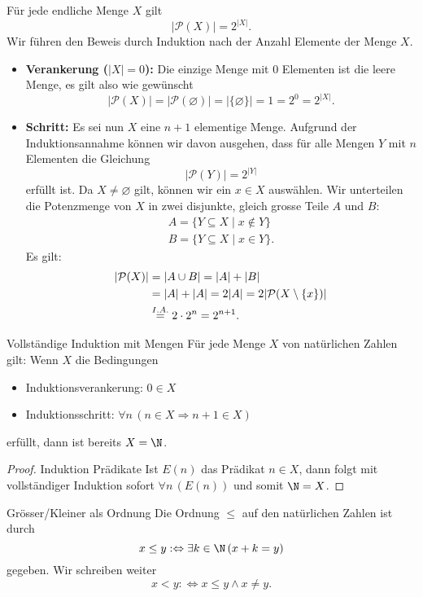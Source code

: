 \begin{example}
Für jede endliche Menge $X$ gilt
\[
|\mathcal{P}(X)|=2^{|X|}.
\]
\tcblower
Wir führen den Beweis durch Induktion nach der Anzahl Elemente der Menge $X$.
\begin{itemize}
\item \textbf{Verankerung ($|X|=0$):} Die einzige Menge mit $0$ Elementen ist die leere Menge, es gilt also wie gewünscht
\[
|\mathcal{P}(X)|=|\mathcal{P}(\varnothing)|=|\{\varnothing\}|=1=2^0=2^{|X|}.
\]
\item \textbf{Schritt:} Es sei nun $X$ eine $n+1$ elementige Menge. Aufgrund der Induktionsannahme können wir davon ausgehen, dass für alle Mengen $Y$ mit $n$ Elementen die Gleichung
\[
|\mathcal{P}(Y)|=2^{|Y|}
\]
 erfüllt ist. Da $X\neq\varnothing$ gilt, können wir ein $x\in X$ auswählen. Wir unterteilen die Potenzmenge von $X$ in zwei disjunkte, gleich grosse Teile $A$ und $B$:
 \begin{align*}
 A=\{Y\subseteq X\mid x\notin Y \}\\
 B=\{Y\subseteq X\mid x\in Y \}.
 \end{align*}
Es gilt:
\begin{align*}
|\mathcal{P}(X)|&=|A\cup B|=|A|+|B|\\
&=|A|+|A|=2|A|=2|\mathcal{P}(X\setminus\{x\})|\\&\stackrel{I.A.}{=}2\cdot2^n=2^{n+1}.\qedhere
\end{align*}
\end{itemize}
\end{example}

\begin{lemma}{Vollständige Induktion mit Mengen}
Für jede Menge $X$ von natürlichen Zahlen gilt: Wenn $X$ die Bedingungen
\begin{itemize}
\item Induktionsverankerung: $0\in X$
\item Induktionsschritt: $\forall n\,(n\in X\Rightarrow n+1\in X)$
\end{itemize}
erfüllt, dann ist bereits $X=\N$.
\end{lemma}
\begin{proof}{Induktion Prädikate}
Ist $E(n)$ das Prädikat $n\in X$, dann folgt mit vollständiger Induktion sofort $\forall n\, (E(n))$ und somit $\N=X$.
\end{proof}

\begin{definition}{Grösser/Kleiner als Ordnung}
Die Ordnung $\leq$ auf den natürlichen Zahlen ist durch
\[
x\leq y:\Leftrightarrow \exists k\in\N\,(x+k=y)
\]
gegeben. Wir schreiben weiter
\[
x<y:\Leftrightarrow x\leq y\land x\neq y.
\]
\end{definition}


